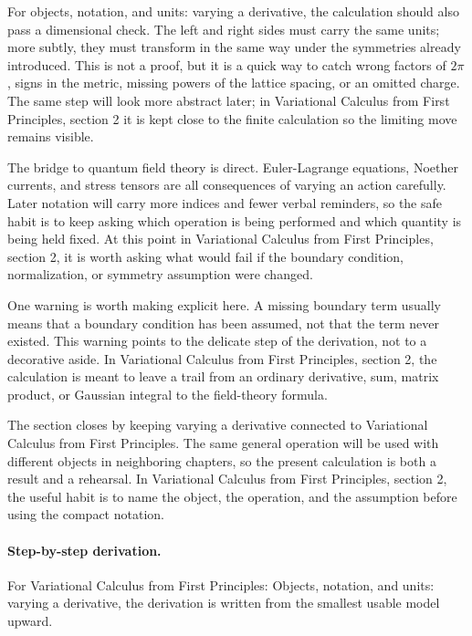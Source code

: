 For objects, notation, and units: varying a derivative, the calculation should also pass a dimensional check.  The left and right sides must carry the same units; more subtly, they must transform in the same way under the symmetries already introduced.  This is not a proof, but it is a quick way to catch wrong factors of \(2\pi\), signs in the metric, missing powers of the lattice spacing, or an omitted charge.  The same step will look more abstract later; in Variational Calculus from First Principles, section 2 it is kept close to the finite calculation so the limiting move remains visible.

The bridge to quantum field theory is direct.  Euler-Lagrange equations, Noether currents, and stress tensors are all consequences of varying an action carefully.  Later notation will carry more indices and fewer verbal reminders, so the safe habit is to keep asking which operation is being performed and which quantity is being held fixed.  At this point in Variational Calculus from First Principles, section 2, it is worth asking what would fail if the boundary condition, normalization, or symmetry assumption were changed.

One warning is worth making explicit here.  A missing boundary term usually means that a boundary condition has been assumed, not that the term never existed.  This warning points to the delicate step of the derivation, not to a decorative aside.  In Variational Calculus from First Principles, section 2, the calculation is meant to leave a trail from an ordinary derivative, sum, matrix product, or Gaussian integral to the field-theory formula.

The section closes by keeping varying a derivative connected to Variational Calculus from First Principles.  The same general operation will be used with different objects in neighboring chapters, so the present calculation is both a result and a rehearsal.  In Variational Calculus from First Principles, section 2, the useful habit is to name the object, the operation, and the assumption before using the compact notation.



\paragraph{Step-by-step derivation.}

For Variational Calculus from First Principles: Objects, notation, and units: varying a derivative, the derivation is written from the smallest usable model upward.

